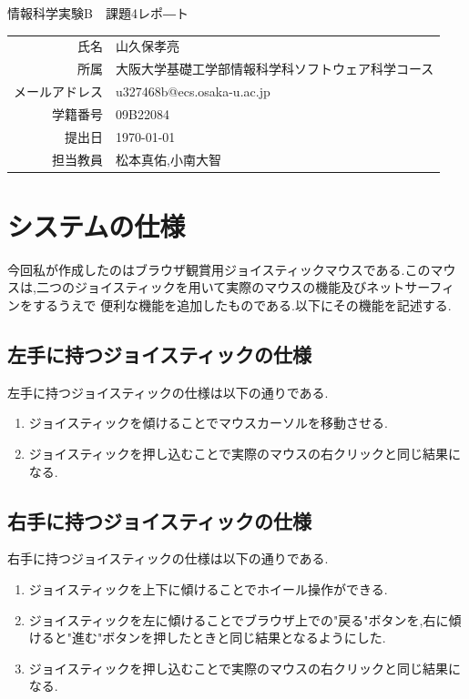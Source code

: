 \documentclass[dvipdfmx]{jarticle}
\begin{document}
\begin{titlepage}
    \begin{center}
        {\huge 情報科学実験B　課題4レポ―ト}
        \vspace{180pt}\\
        \begin{tabular}{rl}
            氏名 & 山久保孝亮\\
            所属 & 大阪大学基礎工学部情報科学科ソフトウェア科学コース\\
            メールアドレス & u327468b@ecs.osaka-u.ac.jp\\
            学籍番号 & 09B22084\\
            提出日 & \today\\
            担当教員 & 松本真佑,小南大智
        \end{tabular}
    \end{center}
\end{titlepage}

\section{システムの仕様}
今回私が作成したのはブラウザ観賞用ジョイスティックマウスである.このマウスは,二つのジョイスティックを用いて実際のマウスの機能及びネットサーフィンをするうえで
便利な機能を追加したものである.以下にその機能を記述する.
\subsection{左手に持つジョイスティックの仕様}
左手に持つジョイスティックの仕様は以下の通りである.
\begin{enumerate}
    \item ジョイスティックを傾けることでマウスカーソルを移動させる.
    \item ジョイスティックを押し込むことで実際のマウスの右クリックと同じ結果になる.
\end{enumerate}
\subsection{右手に持つジョイスティックの仕様}
右手に持つジョイスティックの仕様は以下の通りである.
\begin{enumerate}
    \item ジョイスティックを上下に傾けることでホイール操作ができる.
    \item ジョイスティックを左に傾けることでブラウザ上での"戻る"ボタンを,右に傾けると"進む"ボタンを押したときと同じ結果となるようにした.
    \item ジョイスティックを押し込むことで実際のマウスの右クリックと同じ結果になる.
\end{enumerate}
\end{document}
